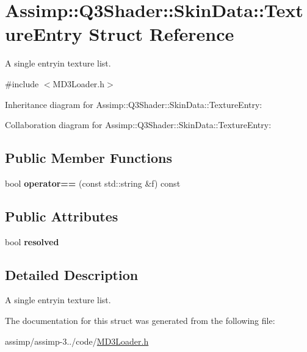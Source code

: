 \hypertarget{struct_assimp_1_1_q3_shader_1_1_skin_data_1_1_texture_entry}{\section{Assimp\+:\+:Q3\+Shader\+:\+:Skin\+Data\+:\+:Texture\+Entry Struct Reference}
\label{struct_assimp_1_1_q3_shader_1_1_skin_data_1_1_texture_entry}
}


A single entryin texture list.  




{\ttfamily \#include $<$M\+D3\+Loader.\+h$>$}



Inheritance diagram for Assimp\+:\+:Q3\+Shader\+:\+:Skin\+Data\+:\+:Texture\+Entry\+:


Collaboration diagram for Assimp\+:\+:Q3\+Shader\+:\+:Skin\+Data\+:\+:Texture\+Entry\+:
\subsection*{Public Member Functions}
\begin{DoxyCompactItemize}
\item 
\hypertarget{struct_assimp_1_1_q3_shader_1_1_skin_data_1_1_texture_entry_a2148b73500940d481bc07614cf8c9f79}{bool {\bfseries operator==} (const std\+::string \&f) const }\label{struct_assimp_1_1_q3_shader_1_1_skin_data_1_1_texture_entry_a2148b73500940d481bc07614cf8c9f79}

\end{DoxyCompactItemize}
\subsection*{Public Attributes}
\begin{DoxyCompactItemize}
\item 
\hypertarget{struct_assimp_1_1_q3_shader_1_1_skin_data_1_1_texture_entry_a61c56f6c557ddb192c75f971e623d789}{bool {\bfseries resolved}}\label{struct_assimp_1_1_q3_shader_1_1_skin_data_1_1_texture_entry_a61c56f6c557ddb192c75f971e623d789}

\end{DoxyCompactItemize}


\subsection{Detailed Description}
A single entryin texture list. 

The documentation for this struct was generated from the following file\+:\begin{DoxyCompactItemize}
\item 
assimp/assimp-\/3../code/\hyperlink{_m_d3_loader_8h}{M\+D3\+Loader.\+h}\end{DoxyCompactItemize}
